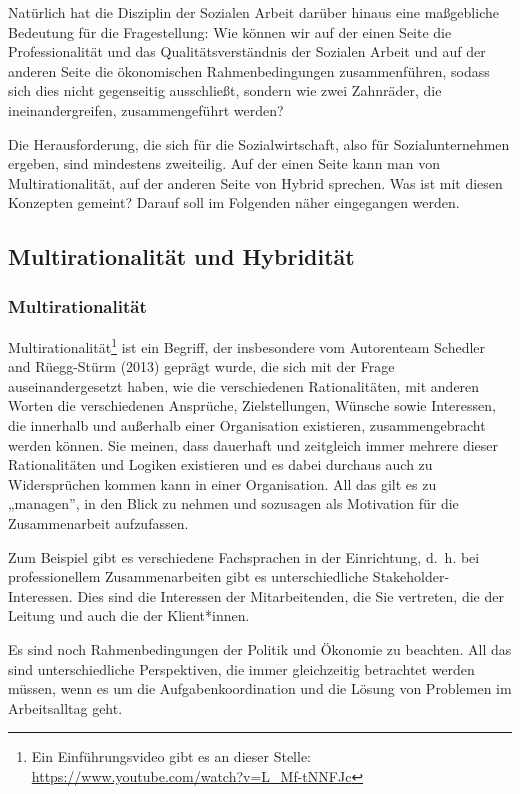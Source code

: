 \documentclass[
  letterpaper,
]{book}
\begin{document}
Natürlich hat die Disziplin der Sozialen Arbeit darüber hinaus eine
maßgebliche Bedeutung für die Fragestellung: Wie können wir auf der
einen Seite die Professionalität und das Qualitätsverständnis der
Sozialen Arbeit und auf der anderen Seite die ökonomischen
Rahmenbedingungen zusammenführen, sodass sich dies nicht gegenseitig
ausschließt, sondern wie zwei Zahnräder, die ineinandergreifen,
zusammengeführt werden?

Die Herausforderung, die sich für die Sozialwirtschaft, also für
Sozialunternehmen ergeben, sind mindestens zweiteilig. Auf der einen
Seite kann man von Multirationalität, auf der anderen Seite von Hybrid
sprechen. Was ist mit diesen Konzepten gemeint? Darauf soll im Folgenden
näher eingegangen werden.

\subsection{Multirationalität und
Hybridität}\label{multirationalitt-und-hybriditaet}

\subsubsection{Multirationalität}\label{sozialwirtschat-multirationalitaet}

Multirationalität\footnote{Ein Einführungsvideo gibt es an dieser
  Stelle: \url{https://www.youtube.com/watch?v=L_Mf-tNNFJc}} ist ein
Begriff, der insbesondere vom Autorenteam Schedler and Rüegg-Stürm
(2013) geprägt wurde, die sich mit der Frage auseinandergesetzt haben,
wie die verschiedenen Rationalitäten, mit anderen Worten die
verschiedenen Ansprüche, Zielstellungen, Wünsche sowie Interessen, die
innerhalb und außerhalb einer Organisation existieren, zusammengebracht
werden können. Sie meinen, dass dauerhaft und zeitgleich immer mehrere
dieser Rationalitäten und Logiken existieren und es dabei durchaus auch
zu Widersprüchen kommen kann in einer Organisation. All das gilt es zu
„managen'', in den Blick zu nehmen und sozusagen als Motivation für die
Zusammenarbeit aufzufassen.

Zum Beispiel gibt es verschiedene Fachsprachen in der Einrichtung, d.~h.
bei professionellem Zusammenarbeiten gibt es unterschiedliche
Stakeholder-Interessen. Dies sind die Interessen der Mitarbeitenden, die
Sie vertreten, die der Leitung und auch die der Klient*innen.

Es sind noch Rahmenbedingungen der Politik und Ökonomie zu beachten. All
das sind unterschiedliche Perspektiven, die immer gleichzeitig
betrachtet werden müssen, wenn es um die Aufgabenkoordination und die
Lösung von Problemen im Arbeitsalltag geht.
\end{document}
